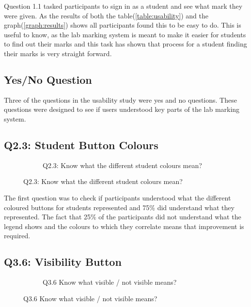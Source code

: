 \documentclass[11pt]{report}
\begin{document}
\noindent Question 1.1 tasked participants to sign in as a student and see what mark they were given. As the results of both the table(\ref{table:usability}) and the graph(\ref{graph:results}) shows all participants found this to be easy to do. This is useful to know, as the lab marking system is meant to make it easier for students to find out their marks and this task has shown that process for a student finding their marks is very straight forward.


\subsection*{Yes/No Question}
Three of the questions in the usability study were yes and no questions. These questions were designed to see if users understood key parts of the lab marking system.

\subsection*{Q2.3: Student Button Colours}

\begin{figure}
\vspace*{-\baselineskip}
\begin{figure}[H]
\caption{Q2.3: Know what the different student colours mean?}


\end{figure}
\end{figure}

The first question was to check if participants understood what the different coloured buttons for students represented and 75\% did understand what they represented. The fact that 25\% of the participants did not understand what the legend shows and the colours to which they correlate means that improvement is required.




\subsection*{Q3.6: Visibility Button}

\begin{figure}
\vspace*{-\baselineskip}
\begin{figure}[H]
\caption{Q3.6 Know what visible / not visible means?}


\end{figure}
\end{figure}
\end{document}
